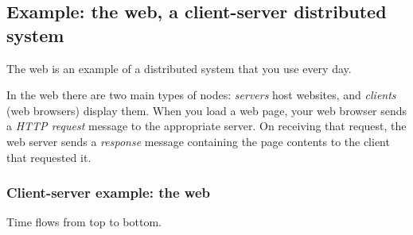\subsection{Example: the web, a client-server distributed system}

The web is an example of a distributed system that you use every day.

\begin{frame}[plain]
    \label{s:website}
\end{frame}

In the web there are two main types of nodes: \emph{servers} host websites, and \emph{clients} (web browsers) display them.
When you load a web page, your web browser sends a \emph{HTTP request} message to the appropriate server.
On receiving that request, the web server sends a \emph{response} message containing the page contents to the client that requested it.

\begin{frame}
    \label{s:client-server}
    \frametitle{Client-server example: the web}
    Time flows from top to bottom.
    \begin{center}
    \end{center}
\end{frame}

